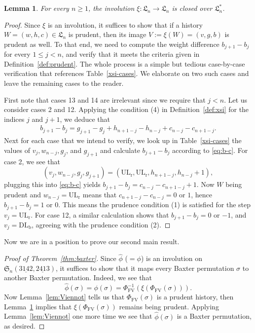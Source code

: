 \documentclass[12pt,reqno]{amsart}
\numberwithin{equation}{section}
\theoremstyle{plain}
\newtheorem{lemma}[theorem]{Lemma}
\theoremstyle{definition}
\def\Sym{\mathfrak{S}}
\def\FV{\mathrm{FV}}
\def\baxter{\mathrm{3\underline{14}2,2\underline{41}3}}
\def\ULr{\operatorname{UL_r}}
\def\DLb{\operatorname{DL_b}}
\def\LH{\mathfrak{L}}
\begin{document}
\begin{lemma}\label{lem:xi closed}
For every $n\ge 1$, the involution $\xi: \LH_n\to \LH_n$ is closed over $\LH^*_n$.
\end{lemma}
\begin{proof}
Since $\xi$ is an involution, it suffices to show that if a history $W=(w,h,c)\in\LH_n$ is prudent, then its image $V:=\xi(W)=(v,g,b)$ is prudent as well. To that end, we need to compute the weight difference $b_{j+1}-b_j$ for every $1\le j<n$, and verify that it meets the criteria given in Definition~\ref{def:prudent}. The whole process is a simple but tedious case-by-case verification that references Table~\ref{xsi-cases}. We elaborate on two such cases and leave the remaining cases to the reader.

First note that cases 13 and 14 are irrelevant since we require that $j<n$. Let us consider cases 2 and 12. Applying the condition (4) in Definition~\ref{def:xsi} for the indices $j$ and $j+1$, we deduce that
\begin{align}\label{eq:b-c}
  b_{j+1}-b_j=g_{j+1}-g_j+h_{n+1-j}-h_{n-j}+c_{n-j}-c_{n+1-j}.
\end{align}
Next for each case that we intend to verify, we look up in Table~\ref{xsi-cases} the values of $v_j,w_{n-j},g_j$, and $g_{j+1}$ and calculate $b_{j+1}-b_j$ according to \eqref{eq:b-c}. For case 2, we see that $$(v_j,w_{n-j},g_j,g_{j+1})=(\ULr,\ULr,h_{n+1-j},h_{n-j}+1),$$ 
plugging this into \eqref{eq:b-c} yields $b_{j+1}-b_j=c_{n-j}-c_{n+1-j}+1$. Now $W$ being prudent and $w_{n-j}=\ULr$ means that $c_{n+1-j}-c_{n-j}=0$ or $1$, hence $b_{j+1}-b_j=1$ or $0$. This means the prudence condition (1) is satisfied for the step $v_j=\ULr$. For case 12, a similar calculation shows that $b_{j+1}-b_j=0$ or $-1$, and $v_j=\DLb$, agreeing with the prudence condition (2).
\end{proof}

Now we are in a position to prove our second main result.
\begin{proof}[Proof of Theorem~\ref{thm:baxter}]
Since $\widehat\phi$ ($=\phi$) is an involution on $\Sym_n(\baxter)$, it suffices to show that it maps every Baxter permutation $\sigma$ to another Baxter permutation. Indeed, we see that
$$\widehat\phi(\sigma)=\phi(\sigma)=\Phi_{\FV}^{-1}(\xi(\Phi_{\FV}(\sigma))).$$
Now Lemma~\ref{lem:Viennot} tells us that $\Phi_{\FV}(\sigma)$ is a prudent history, then Lemma~\ref{lem:xi closed} implies that $\xi(\Phi_{\FV}(\sigma))$ remains being prudent. Applying Lemma~\ref{lem:Viennot} one more time we see that $\widehat\phi(\sigma)$ is a Baxter permutation, as desired.
\end{proof}
\end{document}
